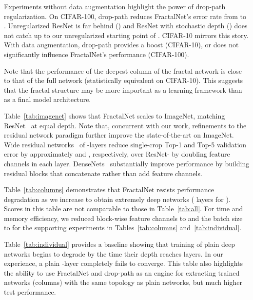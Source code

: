 \documentclass{article}
\newcommand{\fracnet}{FractalNet}
\newcommand{\resnet}{ResNet}
\newcommand{\droppath}{drop-path}
\begin{document}
Experiments without data augmentation highlight the power of {\droppath}
regularization.  On CIFAR-100, {\droppath} reduces {\fracnet}'s error rate
from  to .  Unregularized {\resnet} is far behind ()
and {\resnet} with stochastic depth () does not catch up to our
unregularized starting point of .  CIFAR-10 mirrors this story.  With
data augmentation, {\droppath} provides a boost (CIFAR-10), or does not
significantly influence {\fracnet}'s performance (CIFAR-100).

Note that the performance of the deepest column of the fractal network is
close to that of the full network (statistically equivalent on CIFAR-10).
This suggests that the fractal structure may be more important as a
learning framework than as a final model architecture.

Table~\ref{tab:imagenet} shows that {\fracnet} scales to ImageNet,
matching {\resnet}~\citep{he2015deep} at equal depth.  Note that, concurrent
with our work, refinements to the residual network paradigm further improve
the state-of-the-art on ImageNet.  Wide residual networks~\citep{wideresnet}
of -layers reduce single-crop Top-1 and Top-5 validation error by
approximately  and , respectively, over ResNet- by doubling
feature channels in each layer.  DenseNets~\citep{densenet} substantially
improve performance by building residual blocks that concatenate rather than
add feature channels.

Table~\ref{tab:columns} demonstrates that {\fracnet} resists performance
degradation as we increase  to obtain extremely deep networks ( layers
for ).  Scores in this table are not comparable to those in
Table~\ref{tab:all}.  For time and memory efficiency, we reduced block-wise
feature channels to  and the batch size to  for the
supporting experiments in Tables~\ref{tab:columns} and~\ref{tab:individual}.

Table~\ref{tab:individual} provides a baseline showing that training of plain
deep networks begins to degrade by the time their depth reaches  layers.
In our experience, a plain -layer completely fails to converge. This
table also highlights the ability to use {\fracnet} and {\droppath} as an
engine for extracting trained networks (columns) with the same topology as
plain networks, but much higher test performance.
\end{document}
